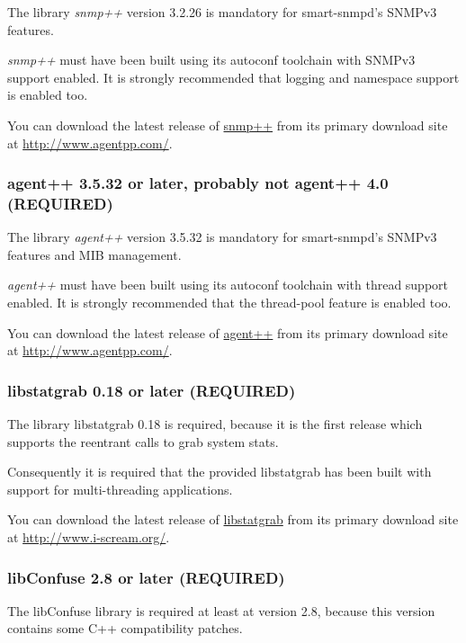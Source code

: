 The library \emph{snmp++} version 3.2.26 is mandatory for
smart-snmpd's SNMPv3 features.

\emph{snmp++} must have been built using its autoconf toolchain with
SNMPv3 support enabled. It is strongly recommended that logging
and namespace support is enabled too.

You can download the latest release of
\href{http://www.agentpp.com/snmp\_pp3\_x/snmp\_pp3\_x.html}{snmp++} from
its primary download site at \url{http://www.agentpp.com/}.

\subsubsection{agent++ 3.5.32 or later, probably not agent++ 4.0 (REQUIRED)}

The library \emph{agent++} version 3.5.32
is mandatory for smart-snmpd's SNMPv3 features and MIB management.

\emph{agent++} must have been built using its autoconf toolchain with
thread support enabled. It is strongly recommended that the
thread-pool feature is enabled too.

You can download the latest release of
\href{http://www.agentpp.com/agentpp3\_5/agentpp3\_5.html}{agent++} from
its primary download site at \url{http://www.agentpp.com/}.

\subsubsection{libstatgrab 0.18 or later (REQUIRED)}

The library libstatgrab 0.18 is required, because it is the first release
which supports the reentrant calls to grab system stats.

Consequently it is required that the provided libstatgrab has been built
with support for multi-threading applications.

You can download the latest release of
\href{http://www.i-scream.org/libstatgrab/}{libstatgrab} from
its primary download site at \url{http://www.i-scream.org/}.

\subsubsection{libConfuse 2.8 or later (REQUIRED)}

The libConfuse library is required at least at version 2.8, because this
version contains some C++ compatibility patches.


